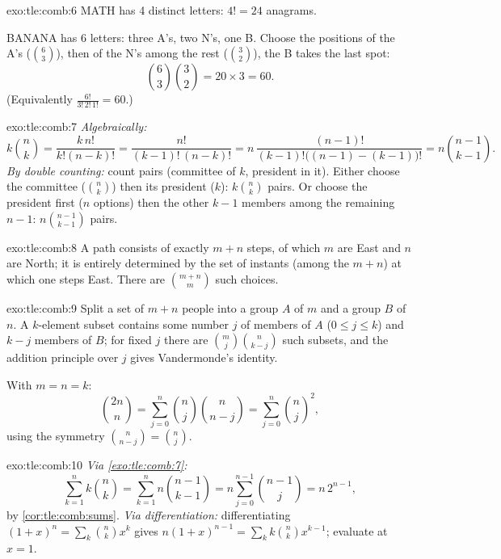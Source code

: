 \begin{solution}{exo:tle:comb:6}
MATH has 4 distinct letters: $4! = 24$ anagrams.

BANANA has 6 letters: three A's, two N's, one B. Choose the positions of the
A's ($\binom63$), then of the N's among the rest ($\binom32$), the B takes
the last spot:
\[
\binom{6}{3}\binom{3}{2} = 20 \times 3 = 60 .
\]
(Equivalently $\frac{6!}{3!\,2!\,1!} = 60$.)
\end{solution}

\begin{solution}{exo:tle:comb:7}
\emph{Algebraically:}
\[
k\binom nk = \frac{k\,n!}{k!(n-k)!} = \frac{n!}{(k-1)!\,(n-k)!}
= n\,\frac{(n-1)!}{(k-1)!\bigl((n-1)-(k-1)\bigr)!} = n\binom{n-1}{k-1}.
\]
\emph{By double counting:} count pairs (committee of $k$, president in it).
Either choose the committee ($\binom nk$) then its president ($k$):
$k\binom nk$ pairs. Or choose the president first ($n$ options) then the
other $k-1$ members among the remaining $n-1$: $n\binom{n-1}{k-1}$ pairs.
\end{solution}

\begin{solution}{exo:tle:comb:8}
A path consists of exactly $m + n$ steps, of which $m$ are East and $n$ are
North; it is entirely determined by the set of instants (among the $m+n$) at
which one steps East. There are $\binom{m+n}{m}$ such choices.
\end{solution}

\begin{solution}{exo:tle:comb:9}
Split a set of $m + n$ people into a group $A$ of $m$ and a group $B$ of
$n$. A $k$-element subset contains some number $j$ of members of $A$
($0 \leq j \leq k$) and $k - j$ members of $B$; for fixed $j$ there are
$\binom mj \binom{n}{k-j}$ such subsets, and the addition principle over $j$
gives Vandermonde's identity.

With $m = n = k$:
\[
\binom{2n}{n} = \sum_{j=0}^n \binom nj \binom{n}{n-j}
= \sum_{j=0}^n \binom nj^{2},
\]
using the symmetry $\binom{n}{n-j} = \binom nj$.
\end{solution}

\begin{solution}{exo:tle:comb:10}
\emph{Via \cref{exo:tle:comb:7}:}
\[
\sum_{k=1}^n k\binom nk = \sum_{k=1}^n n\binom{n-1}{k-1}
= n\sum_{j=0}^{n-1}\binom{n-1}{j} = n\,2^{n-1},
\]
by \cref{cor:tle:comb:sums}. \emph{Via differentiation:} differentiating
$(1+x)^n = \sum_k \binom nk x^k$ gives
$n(1+x)^{n-1} = \sum_k k \binom nk x^{k-1}$; evaluate at $x = 1$.
\end{solution}
